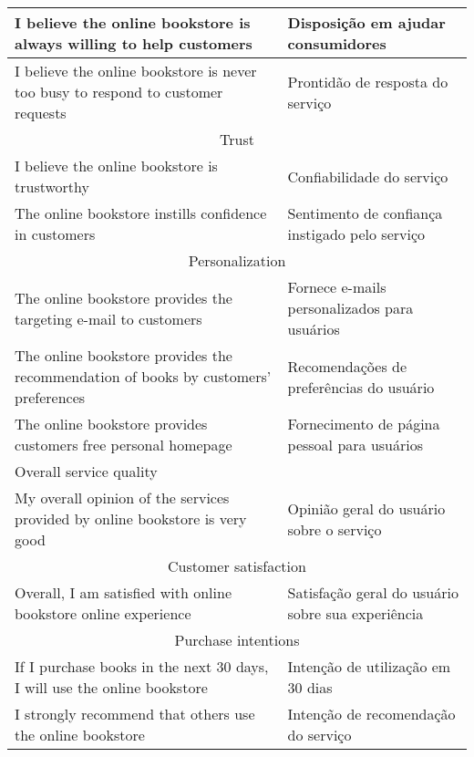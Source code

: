 \begin{apendicesenv}
\begin{table}[]
{\begin{tabular}{|l|l|}
I believe the online bookstore is always willing to help customers & Disposição em ajudar consumidores \\ \hline
I believe the online bookstore is never too busy to respond to customer requests & Prontidão de resposta do serviço \\ \hline
\multicolumn{2}{|c|}{\cellcolor[HTML]{C0C0C0}Trust} \\ \hline
I believe the online bookstore is trustworthy & Confiabilidade do serviço \\ \hline
The online bookstore instills confidence in customers & Sentimento de confiança instigado pelo serviço \\ \hline
\multicolumn{2}{|c|}{\cellcolor[HTML]{C0C0C0}Personalization} \\ \hline
The online bookstore provides the targeting e-mail to customers & Fornece e-mails personalizados para usuários \\ \hline
The online bookstore provides the recommendation of books by customers’ preferences & Recomendações de preferências do usuário \\ \hline
The online bookstore provides customers free personal homepage & Fornecimento de página pessoal para usuários \\ \hline
Overall service quality &  \\ \hline
My overall opinion of the services provided by online bookstore is very good & Opinião geral do usuário sobre o serviço \\ \hline
\multicolumn{2}{|c|}{\cellcolor[HTML]{C0C0C0}Customer satisfaction} \\ \hline
Overall, I am satisfied with online bookstore online experience & Satisfação geral do usuário sobre sua experiência \\ \hline
\multicolumn{2}{|c|}{\cellcolor[HTML]{C0C0C0}Purchase intentions} \\ \hline
If I purchase books in the next 30 days, I will use the online bookstore & Intenção de utilização em 30 dias \\ \hline
I strongly recommend that others use the online bookstore & Intenção de recomendação do serviço \\ \hline
\end{tabular}%
}
\end{table}


\end{apendicesenv}
